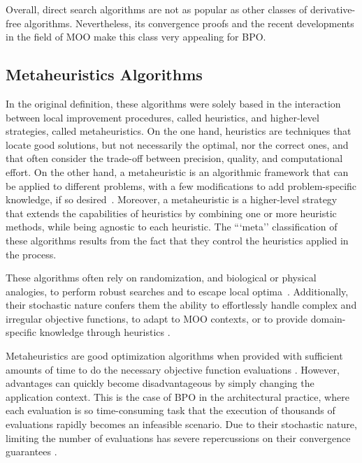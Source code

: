 	Overall, direct search algorithms are not as popular as other classes of derivative-free algorithms. Nevertheless, its convergence proofs and the recent developments in the field of \ac{MOO} make this class very appealing for \ac{BPO}. 
	
	\subsection{Metaheuristics Algorithms}
	\label{ssec:metaheuristics}
	In the original definition, these algorithms were solely based in the interaction between local improvement procedures, called heuristics, and higher-level strategies, called metaheuristics. On the one hand, heuristics are techniques that locate good solutions, but not necessarily the optimal, nor the correct ones, and that often consider the trade-off between precision, quality, and computational effort. On the other hand, a metaheuristic is an algorithmic framework that can be applied to different problems, with a few modifications to add problem-specific knowledge, if so desired~\cite{Glover2003Metaheuristics}. Moreover, a metaheuristic is a higher-level strategy that extends the capabilities of heuristics by combining one or more heuristic methods, while being agnostic to each heuristic. The ```meta'' classification of these algorithms results from the fact that they control the heuristics applied in the process.
	
	These algorithms often rely on randomization, and biological or physical analogies, to perform robust searches and to escape local optima~\cite{Glover2003Metaheuristics}. Additionally, their stochastic nature confers them the ability to effortlessly handle complex and irregular objective functions, to adapt to \ac{MOO} contexts, or to provide domain-specific knowledge through heuristics \cite{Wortmann2017GABESTCHOICE}.
	
	Metaheuristics are good optimization algorithms when provided with sufficient amounts of time to do the necessary objective function evaluations \cite{Conn2009}. However, advantages can quickly become disadvantageous by simply changing the application context. This is the case of BPO in the architectural practice, where each evaluation is so time-consuming task that the execution of thousands of evaluations rapidly becomes an infeasible scenario. Due to their stochastic nature, limiting the number of evaluations has severe repercussions on their convergence guarantees \cite{Hasancebi2009}.
	
